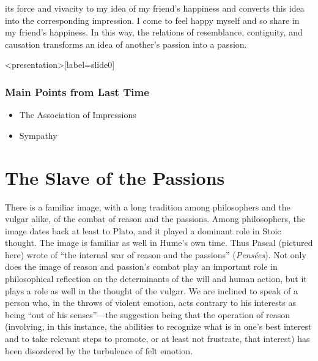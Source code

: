 its force and vivacity to my idea of my friend's happiness and converts this idea into the corresponding impression. I come to feel happy myself and so share in my friend's happiness. In this way, the relations of resemblance, contiguity, and causation transforms an idea of another's passion into a passion. \change

% 

\begin{frame}<presentation>[label=slide0]
    \frametitle{Main Points from Last Time}
        \begin{itemize}
        \item<1-> The Association of Impressions
        \item<2-> Sympathy
        \end{itemize}
\end{frame}


\section{The Slave of the Passions}\label{sec:the_slave_of_the_passions} %

There is a familiar image, with a long tradition among philosophers and the vulgar alike, of the combat of reason and the passions. Among philosophers, the image dates back at least to Plato, and it played a dominant role in Stoic thought. The image is familiar as well in Hume's own time. Thus Pascal (pictured here) wrote of ``the internal war of reason and the passions'' (\emph{Pens\'{e}es}). Not only does the image of reason and passion's combat play an important role in philosophical reflection on the determinants of the will and human action, but it plays a role as well in the thought of the vulgar. We are inclined to speak of a person who, in the throws of violent emotion, acts contrary to his interests as being ``out of his senses''---the suggestion being that the operation of reason (involving, in this instance, the abilities to recognize what is in one's best interest and to take relevant steps to promote, or at least not frustrate, that interest) has been disordered by the turbulence of felt emotion.

